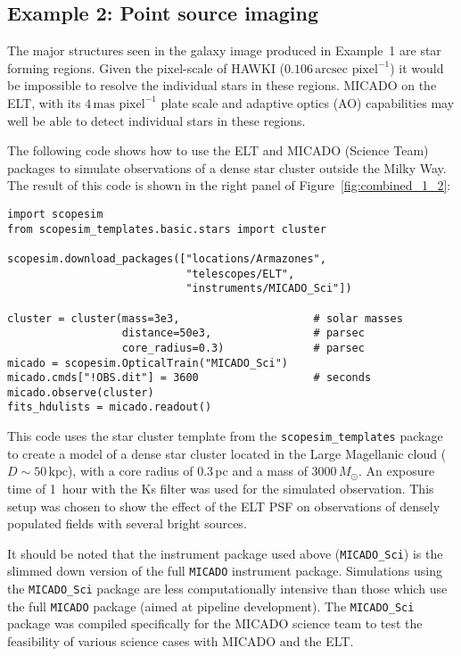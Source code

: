 \subsection{Example 2: Point source imaging}
\label{example-2-point-source-imaging}

The major structures seen in the galaxy image produced in Example~1
are star forming regions.  Given the pixel-scale of HAWKI
($0.106\,\mathrm{arcsec\,\,pixel^{-1}}$) it would be impossible to
resolve the individual stars in these regions.  MICADO on the ELT,
with its $4\,\mathrm{mas\,\,pixel^{-1}}$ plate scale and adaptive optics
(AO) capabilities may well be able to detect individual stars in these
regions.

The following code shows how to use the ELT and MICADO (Science Team)
packages to simulate observations of a dense star cluster outside the
Milky Way.  The result of this code is shown in the right panel of
Figure~\ref{fig:combined_1_2}:

\begin{lstlisting}[frame=single]
import scopesim
from scopesim_templates.basic.stars import cluster

scopesim.download_packages(["locations/Armazones",
                            "telescopes/ELT",
                            "instruments/MICADO_Sci"])

cluster = cluster(mass=3e3,                     # solar masses
                  distance=50e3,                # parsec
                  core_radius=0.3)              # parsec
micado = scopesim.OpticalTrain("MICADO_Sci")
micado.cmds["!OBS.dit"] = 3600                  # seconds
micado.observe(cluster)
fits_hdulists = micado.readout()
\end{lstlisting}

This code uses the star cluster template from the
\lstinline{scopesim_templates} package to create a model of a dense
star cluster located in the Large Magellanic cloud
($D\sim 50\,\mathrm{kpc}$), with a core radius of 0.3\,pc and a mass
of $3000\,M_{\odot}$.  An exposure time of 1~hour with the Ks filter
was used for the simulated observation.  This setup was chosen to show
the effect of the ELT PSF on observations of densely populated fields
with several bright sources.

It should be noted that the instrument package used above
(\lstinline{MICADO_Sci}) is the slimmed down version of the full
\lstinline{MICADO} instrument package.  Simulations using the
\lstinline{MICADO_Sci} package are less computationally intensive than
those which use the full \lstinline{MICADO} package (aimed at pipeline
development).  The \lstinline{MICADO_Sci} package was compiled
specifically for the MICADO science team to test the feasibility of
various science cases with MICADO and the ELT.


